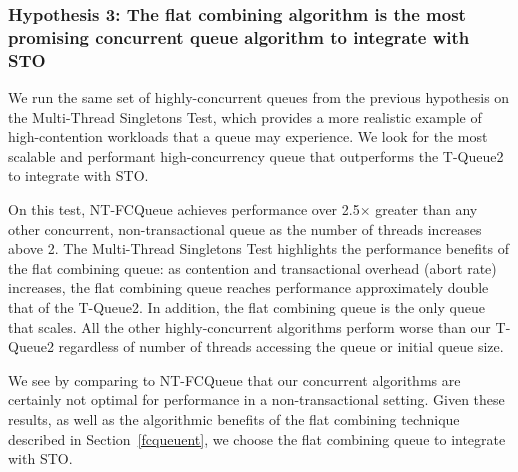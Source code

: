 \vspace{12pt}
\noindent{}

\subsubsection{Hypothesis 3: The flat combining algorithm is the most promising concurrent queue algorithm to integrate with STO}

We run the same set of highly-concurrent queues from the previous hypothesis on the Multi-Thread Singletons Test, which provides a more realistic example of high-contention workloads that a queue may experience. We look for the most scalable and performant high-concurrency queue that outperforms the T-Queue2 to integrate with STO.

On this test, NT-FCQueue achieves performance over 2.5$\times$ greater than any other concurrent, non-transactional queue as the number of threads increases above 2. The Multi-Thread Singletons Test highlights the performance benefits of the flat combining queue: as contention and transactional overhead (abort rate) increases, the flat combining queue reaches performance approximately double that of the T-Queue2. In addition, the flat combining queue is the only queue that scales. All the other highly-concurrent algorithms perform worse than our T-Queue2 regardless of number of threads accessing the queue or initial queue size.

We see by comparing to NT-FCQueue that our concurrent algorithms are certainly not optimal for performance in a non-transactional setting.
Given these results, as well as the algorithmic benefits of the flat combining technique described in Section~\ref{fcqueuent}, we choose the flat combining queue to integrate with STO.

\vspace{12pt}
\noindent{}

